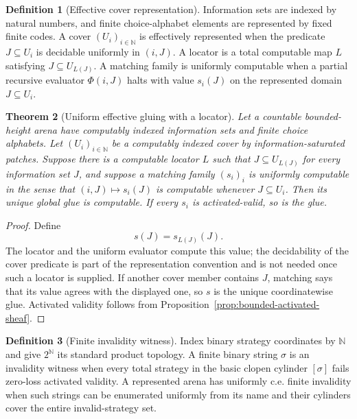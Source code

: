 \documentclass[11pt]{article}
\theoremstyle{plain}
\newtheorem{theorem}{Theorem}[section]
\theoremstyle{definition}
\newtheorem{definition}[theorem]{Definition}
\theoremstyle{remark}
\newcommand{\N}{\mathbb{N}}
\begin{document}
\begin{definition}[Effective cover representation]
\label{def:effective-cover-representation}
Information sets are indexed by natural numbers, and finite choice-alphabet
elements are represented by fixed finite codes. A cover $(U_i)_{i\in\N}$ is
effectively represented when the predicate $J\subseteq U_i$ is decidable
uniformly in $(i,J)$. A locator is a total computable map $L$ satisfying
$J\subseteq U_{L(J)}$. A matching family is uniformly computable when a partial
recursive evaluator $\Phi(i,J)$ halts with value $s_i(J)$ on the represented
domain $J\subseteq U_i$.
\end{definition}

\begin{theorem}[Uniform effective gluing with a locator]
\label{thm:uniform-effective-gluing}
Let a countable bounded-height arena have computably indexed information sets
and finite choice alphabets. Let $(U_i)_{i\in\N}$ be a computably indexed cover
by information-saturated patches. Suppose there is a computable locator
$L$ such that $J\subseteq U_{L(J)}$ for every information set $J$, and suppose
a matching family $(s_i)_i$ is uniformly computable in the sense that
$(i,J)\mapsto s_i(J)$ is computable whenever $J\subseteq U_i$. Then its unique
global glue is computable. If every $s_i$ is activated-valid, so is the glue.
\end{theorem}

\begin{proof}
Define
\[
s(J)=s_{L(J)}(J).
\]
The locator and the uniform evaluator compute this value; the decidability of
the cover predicate is part of the representation convention and is not needed
once such a locator is supplied. If another cover
member contains $J$, matching says that its value agrees with the displayed
one, so $s$ is the unique coordinatewise glue. Activated validity follows from
Proposition~\ref{prop:bounded-activated-sheaf}.
\end{proof}


\begin{definition}[Finite invalidity witness]
\label{def:finite-invalidity-witness}
Index binary strategy coordinates by $\N$ and give $2^\N$ its standard product
topology. A finite binary string $\sigma$ is an invalidity witness when every
total strategy in the basic clopen cylinder $[\sigma]$ fails zero-loss activated
validity. A represented arena has uniformly c.e. finite invalidity when such
strings can be enumerated uniformly from its name and their cylinders cover the
entire invalid-strategy set.
\end{definition}
\end{document}
